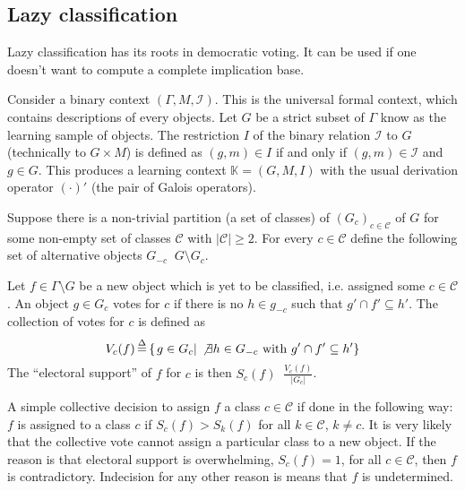 \documentclass[a4paper]{article}
\newcommand{\obj}[1]{{\left\{ #1 \right \}}}
\newcommand{\brac}[1]{{\left ( #1 \right )}}
\newcommand{\induc}[1]{{\left . #1 \right \vert}}
\newcommand{\abs}[1]{{\left | #1 \right |}}
\newcommand{\Ical}{\mathcal{I}}
\newcommand{\Ctx}{\mathbb{K}}
\newcommand{\defn}{\mathop{\overset{\Delta}{=}}\nolimits}
\begin{document}
\subsection{Lazy classification} %
\label{sub:lazy_classification}

Lazy classification has its roots in democratic voting. It can be used if one doesn't want to compute a complete implication base.

Consider a binary context $(\Gamma, M, \Ical)$. This is the universal formal context, which contains descriptions of every objects. Let $G$ be a strict subset of $\Gamma$ know as the learning sample of objects. The restriction $I$ of the binary relation $\Ical$ to $G$ (technically to $G\times M$) is defined as $(g,m)\in I$ if and only if $(g,m)\in \Ical$ and $g\in G$. This produces a learning context $\Ctx = (G,M,I)$ with the usual derivation operator ${(\cdot)}'$ (the pair of Galois operators).

Suppose there is a non-trivial partition (a set of classes) of $\brac{G_c}_{c\in \mathcal{C}}$ of $G$ for some non-empty set of classes $\mathcal{C}$ with $\abs{\mathcal{C}}\geq 2$. For every $c\in \mathcal{C}$ define the following set of alternative objects $G_{-c} \defn G\setminus G_c$.

Let $f\in \Gamma\setminus G$ be a new object which is yet to be classified, i.e. assigned some $c\in \mathcal{C}$. An object $g\in G_c$ votes for $c$ if there is no $h\in g_{-c}$ such that $g' \cap f'\subseteq h'$. The collection of votes for $c$ is defined as \[V_c(f) \defn\obj{ \induc{ g\in G_c }\, \not\exists h\in G_{-c}\text{ with } g' \cap f'\subseteq h' }\] The ``electoral support'' of $f$ for $c$ is then $S_c(f)\defn \frac{V_c(f)}{\abs{G_c}}$.

A simple collective decision to assign $f$ a class $c\in \mathcal{C}$ if done in the following way: $f$ is assigned to a class $c$ if $S_c(f) > S_k(f)$ for all $k\in \mathcal{C}$, $k\neq c$. It is very likely that the collective vote cannot assign a particular class to a new object. If the reason is that electoral support is overwhelming, $S_c(f)=1$, for all $c\in \mathcal{C}$, then $f$ is contradictory. Indecision for any other reason is means that $f$ is undetermined.


\end{document}
